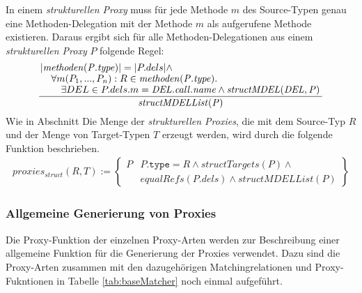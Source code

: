 \documentclass[a4paper,12pt]{article}
\begin{document}
In einem \emph{strukturellen Proxy} muss für jede Methode $m$ des Source-Typen genau eine Methoden-Delegation mit der Methode $m$ als aufgerufene Methode existieren. Daraus ergibt sich für alle Methoden-Delegationen aus einem \emph{strukturellen Proxy} $P$ folgende Regel:
\begin{gather*}
\frac{\splitfrac{|\mathit{methoden(P.type)}| = |P.dels| \wedge}{ \splitfrac{\forall m(P_1,...,P_n):R \in \mathit{methoden(P.type)}.}{\exists DEL \in P.dels.m = \mathit{DEL.call.name} \wedge \mathit{structMDEL(DEL,P)}
 }}
}
{\mathit{structMDELList(P)}}
\end{gather*}
Wie in Abschnitt 
Die Menge der \emph{strukturellen Proxies}, die mit dem Source-Typ $R$ und der Menge von Target-Typen $T$ erzeugt werden, wird durch die folgende Funktion beschrieben.
\begin{gather*}
\mathit{proxies_{struct}(R,T)} := 
\left\{\begin{array}{l|l}
	P	& P\texttt{.type} = R \wedge  \mathit{structTargets(P)} \wedge \mathit{ }\\
		& \mathit{equalRefs(P.dels)} \wedge \mathit{structMDELList(P)} 
		 \end{array}
\right\}
\end{gather*}

\subsubsection{Allgemeine Generierung von Proxies}
Die Proxy-Funktion der einzelnen Proxy-Arten werden zur Beschreibung einer allgemeine Funktion für die Generierung der Proxies verwendet. Dazu sind die Proxy-Arten zusammen mit den dazugehörigen Matchingrelationen und Proxy-Fukntionen in Tabelle \ref{tab:baseMatcher} noch einmal aufgeführt.
\end{document}
